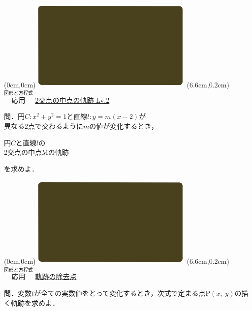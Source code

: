 \documentclass[10pt,
fleqn,
dvipdfmx,
uplatex
]{jsarticle}
\begin{document}
\at(0cm,0cm){\includegraphics[width=8cm,bb=0 0 1920 1080]{./youtube/thumbnails/templates/smart_background/図形と方程式.jpeg}}
\at(6.6cm,0.2cm){\small\color{bradorange}$\overset{\text{図形と方程式}}{\text{応用}}$}
{\color{orange}\Large\underline{2交点の中点の軌跡 Lv.2}}\vspace{0.3zw}



\small 
問．円$C:x^2+y^2=1$と直線$l:y=m\left(x-2\right)$が\\
\hspace{0.2zw}異なる$2$点で交わるように$m$の値が変化するとき，

\huge
\vspace{-0.2zw}
\hspace{0.2zw}円$C$と直線$l$の\vspace{-0.0zw}\\
\hfill 2交点の中点$\text{M}$の軌跡\hspace{0.4zw}

\small
\vspace{0.2zw}
\hfill を求めよ．


\newpage



\at(0cm,0cm){\includegraphics[width=8cm,bb=0 0 1920 1080]{./youtube/thumbnails/templates/smart_background/図形と方程式.jpeg}}
\at(6.6cm,0.2cm){\small\color{bradorange}$\overset{\text{図形と方程式}}{\text{応用}}$}
{\color{orange}\huge\underline{軌跡の除去点}}\vspace{0.3zw}

\normalsize 
問．変数$t$が全ての実数値をとって変化するとき，次式で定まる点$\text{P}\left(x,\;y\right)$の描く軌跡を求めよ．
\end{document}
